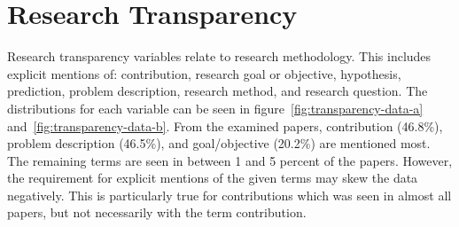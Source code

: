 \section{Research Transparency}
Research transparency variables relate to research methodology. This includes explicit mentions of: contribution, research goal or objective, hypothesis, prediction, problem description, research method, and research question. The distributions for each variable can be seen in figure~\ref{fig:transparency-data-a} and~\ref{fig:transparency-data-b}. From the examined papers, contribution (46.8\%), problem description (46.5\%), and goal/objective (20.2\%) are mentioned most. The remaining terms are seen in between 1 and 5 percent of the papers. However, the requirement for explicit mentions of the given terms may skew the data negatively. This is particularly true for contributions which was seen in almost all papers, but not necessarily with the term contribution.

